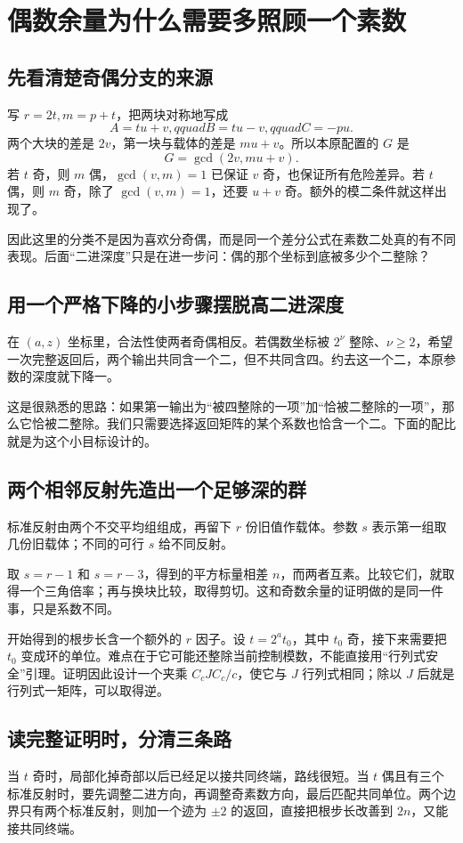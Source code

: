 \chapter{偶数余量为什么需要多照顾一个素数}\label{app:lower}
\section{先看清楚奇偶分支的来源}
写 $r=2t,m=p+t$，把两块对称地写成
\[A=tu+v,qquad B=tu-v,qquad C=-pu.
\]
两个大块的差是 $2v$，第一块与载体的差是 $mu+v$。所以本原配置的 $G$ 是
\[G=\gcd(2v,mu+v).
\]
若 $t$ 奇，则 $m$ 偶，$\gcd(v,m)=1$ 已保证 $v$ 奇，也保证所有危险差异。若 $t$ 偶，则 $m$ 奇，除了 $\gcd(v,m)=1$，还要 $u+v$ 奇。额外的模二条件就这样出现了。

因此这里的分类不是因为喜欢分奇偶，而是同一个差分公式在素数二处真的有不同表现。后面“二进深度”只是在进一步问：偶的那个坐标到底被多少个二整除？

\section{用一个严格下降的小步骤摆脱高二进深度}
在 $(a,z)$ 坐标里，合法性使两者奇偶相反。若偶数坐标被 $2^\nu$ 整除、$\nu\ge2$，希望一次完整返回后，两个输出共同含一个二，但不共同含四。约去这一个二，本原参数的深度就下降一。

这是很熟悉的思路：如果第一输出为“被四整除的一项”加“恰被二整除的一项”，那么它恰被二整除。我们只需要选择返回矩阵的某个系数也恰含一个二。下面的配比就是为这个小目标设计的。

\section{两个相邻反射先造出一个足够深的群}
标准反射由两个不交平均组组成，再留下 $r$ 份旧值作载体。参数 $s$ 表示第一组取几份旧载体；不同的可行 $s$ 给不同反射。

取 $s=r-1$ 和 $s=r-3$，得到的平方标量相差 $n$，而两者互素。比较它们，就取得一个三角倍率；再与换块比较，取得剪切。这和奇数余量的证明做的是同一件事，只是系数不同。

开始得到的根步长含一个额外的 $r$ 因子。设 $t=2^a t_0$，其中 $t_0$ 奇，接下来需要把 $t_0$ 变成环的单位。难点在于它可能还整除当前控制模数，不能直接用“行列式安全”引理。证明因此设计一个夹乘 $C_cJC_c/c$，使它与 $J$ 行列式相同；除以 $J$ 后就是行列式一矩阵，可以取得逆。

\section{读完整证明时，分清三条路}
当 $t$ 奇时，局部化掉奇部以后已经足以接共同终端，路线很短。当 $t$ 偶且有三个标准反射时，要先调整二进方向，再调整奇素数方向，最后匹配共同单位。两个边界只有两个标准反射，则加一个迹为 $\pm2$ 的返回，直接把根步长改善到 $2n$，又能接共同终端。

